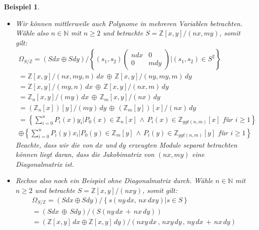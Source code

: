 \documentclass[10pt,a4paper]{report}
\newcounter{Aussage}[chapter]
\newtheorem{bsp}[Aussage]{Beispiel}
\newcommand{\divR}[2]{\Omega_{#1/#2}}
\begin{document}
\begin{bsp}
\begin{itemize}
\item[(3.6)] Wir können mittlerweile auch Polynome in mehreren Variablen betrachten. Wähle also $n \in \mathbb{N}$ mit $n \geq 2$ und betrachte $S = \mathbb{Z}[x,y]/(nx,my)$, somit gilt:
\begin{gather*}
\divR{S}{\mathbb{Z}}
= (S dx \oplus S dy) / \left\lbrace (s_1,s_2)
\begin{pmatrix}
n dx & 0 \\
0    & m dy
\end{pmatrix}
\vert (s_1, s_2) \in S^2 \right\rbrace \\
= \mathbb{Z}[x,y]/(nx, my ,n) \, dx \, \oplus \,  \mathbb{Z}[x,y]/(ny , my , m) \, dy \\
= \mathbb{Z}[x,y]/(my , n) \, dx \, \oplus \, \mathbb{Z}[x,y]/(nx,m) \, dy \\
= \mathbb{Z}_n[x,y]/(my) \, dx \, \oplus \, \mathbb{Z}_m[x,y]/(nx) \, dy \\
= (\mathbb{Z}_n[x])[y]/(my) \, dy \, \oplus \, (\mathbb{Z}_m[y])[x]/(nx) \, dy \\
= \left\lbrace \sum_{i = 0}^n P_i(x) y_i \vert P_0(x) \in \mathbb{Z}_n[x] \, \wedge \, P_i(x) \in \mathbb{Z}_{ggt(n,m)}[x] \textit{ für } i \geq 1 \right\rbrace \\
\oplus \left\lbrace \sum_{i = 0}^n P_i(y) x_i \vert P_0(y) \in \mathbb{Z}_m[y] \, \wedge \, P_i(y) \in \mathbb{Z}_{ggt(n,m)}[y] \textit{ für } i \geq 1 \right\rbrace
\end{gather*}
Beachte, dass wir die von $dx$ und $dy$ erzeugten Module separat betrachten können liegt daran, dass die Jakobimatrix von $(nx,my)$ eine Diagonalmatrix ist.

\item[(3.7)] Rechne also noch ein Beispiel ohne Diagonalmatrix durch. Wähle $n \in \mathbb{N}$ mit $n \geq 2$ und betrachte $S = \mathbb{Z}[x,y]/(nxy)$, somit gilt:
\begin{gather*}
\divR{S}{\mathbb{Z}}
= (S dx \oplus S dy) /  \left\lbrace s
(ny \, dx , \, nx \, dxy)
\vert s \in S \right\rbrace\\
= (Sdx \, \oplus \, Sdy) / (S(ny \, dx \, + \, nx \, dy))\\
= (\mathbb{Z}[x,y] \, dx \oplus \mathbb{Z}[x,y] \, dy) / (nxy \, dx \, , \, nxy \, dy \, , \, ny \, dx \, + \, nx \, dy)
\end{gather*}


\end{itemize}
\end{bsp}
\end{document}
